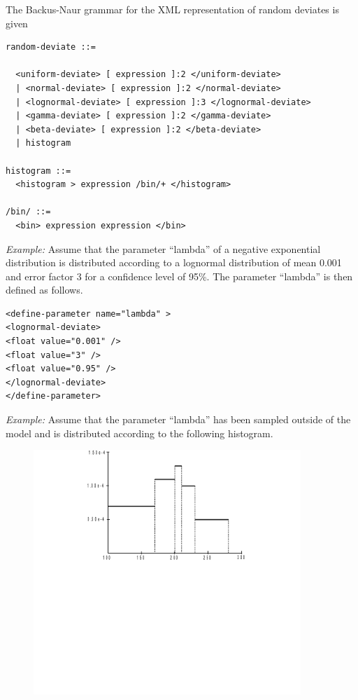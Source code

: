 \documentclass[11pt]{article}
\begin{document}
The Backus-Naur grammar for the XML representation of random deviates is
given


\begin{lstlisting}
random-deviate ::=

  <uniform-deviate> [ expression ]:2 </uniform-deviate>
  | <normal-deviate> [ expression ]:2 </normal-deviate>
  | <lognormal-deviate> [ expression ]:3 </lognormal-deviate>
  | <gamma-deviate> [ expression ]:2 </gamma-deviate>
  | <beta-deviate> [ expression ]:2 </beta-deviate>
  | histogram

histogram ::=
  <histogram > expression /bin/+ </histogram>

/bin/ ::=
  <bin> expression expression </bin>
\end{lstlisting}


\emph{Example:} Assume that the parameter ``lambda'' of a negative exponential
distribution is distributed according to a lognormal distribution of
mean 0.001 and error factor 3 for a confidence level of 95\%. The
parameter ``lambda'' is then defined as follows.


\lstset{language=XML,label= ,caption= ,captionpos=b,numbers=none}
\begin{lstlisting}
<define-parameter name="lambda" >
<lognormal-deviate>
<float value="0.001" />
<float value="3" />
<float value="0.95" />
</lognormal-deviate>
</define-parameter>
\end{lstlisting}

\emph{Example:} Assume that the parameter ``lambda'' has been sampled outside
of the model and is distributed according to the following histogram.

\begin{figure}[htbp]

\includegraphics[width=0.9\textwidth]{./word/media/image9.png}
\caption{\label{fig:org9bcb430}
}
\end{figure}
\end{document}
